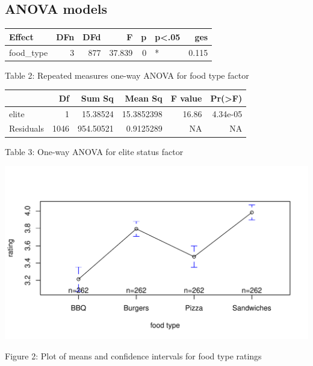 \documentclass[
]{article}
\begin{document}
\subsection{ANOVA models}

\begin{longtable}[]{@{}lrrrrlr@{}}
\toprule()
Effect & DFn & DFd & F & p & p\textless.05 & ges \\
\midrule()
\endhead
food\_type & 3 & 877 & 37.839 & 0 & * & 0.115 \\
\bottomrule()
\end{longtable}

\begin{center}  
Table 2: Repeated measures one-way ANOVA for food type factor  
\end{center}

\begin{longtable}[]{@{}lrrrrr@{}}
\toprule()
& Df & Sum Sq & Mean Sq & F value & Pr(\textgreater F) \\
\midrule()
\endhead
elite & 1 & 15.38524 & 15.3852398 & 16.86 & 4.34e-05 \\
Residuals & 1046 & 954.50521 & 0.9125289 & NA & NA \\
\bottomrule()
\end{longtable}

\begin{center}  
Table 3: One-way ANOVA for elite status factor  
\end{center}

\includegraphics{customer_ratings_analysis_files/figure-latex/unnamed-chunk-5-1.pdf}

\begin{center}  
Figure 2: Plot of means and confidence intervals for food type ratings  
\end{center}
\end{document}
